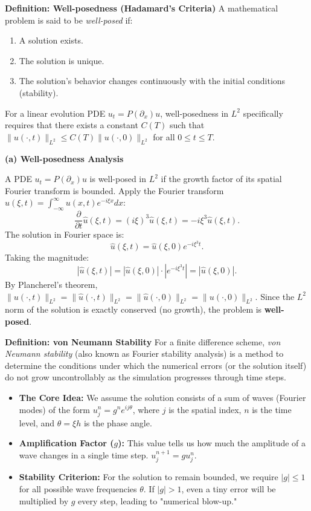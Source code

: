 \begin{solution}
\textbf{Definition: Well-posedness (Hadamard's Criteria)}
A mathematical problem is said to be \textit{well-posed} if:
\begin{enumerate}
    \item A solution exists.
    \item The solution is unique.
    \item The solution's behavior changes continuously with the initial conditions (stability).
\end{enumerate}
For a linear evolution PDE $u_t = P(\partial_x)u$, well-posedness in $L^2$ specifically requires that there exists a constant $C(T)$ such that $\|u(\cdot, t)\|_{L^2} \leq C(T) \|u(\cdot, 0)\|_{L^2}$ for all $0 \leq t \leq T$.

\textbf{(a) Well-posedness Analysis}

A PDE $u_t = P(\partial_x)u$ is well-posed in $L^2$ if the growth factor of its spatial Fourier transform is bounded.
Apply the Fourier transform $\hat{u}(\xi, t) = \int_{-\infty}^\infty u(x, t) e^{-i\xi x} dx$:
\[ \frac{\partial}{\partial t} \hat{u}(\xi, t) = (i\xi)^3 \hat{u}(\xi, t) = -i\xi^3 \hat{u}(\xi, t). \]
The solution in Fourier space is:
\[ \hat{u}(\xi, t) = \hat{u}(\xi, 0) e^{-i\xi^3 t}. \]
Taking the magnitude:
\[ |\hat{u}(\xi, t)| = |\hat{u}(\xi, 0)| \cdot |e^{-i\xi^3 t}| = |\hat{u}(\xi, 0)|. \]
By Plancherel's theorem, $\|u(\cdot, t)\|_{L^2} = \|\hat{u}(\cdot, t)\|_{L^2} = \|\hat{u}(\cdot, 0)\|_{L^2} = \|u(\cdot, 0)\|_{L^2}$.
Since the $L^2$ norm of the solution is exactly conserved (no growth), the problem is \textbf{well-posed}.

\textbf{Definition: von Neumann Stability}
For a finite difference scheme, \textit{von Neumann stability} (also known as Fourier stability analysis) is a method to determine the conditions under which the numerical errors (or the solution itself) do not grow uncontrollably as the simulation progresses through time steps.

\begin{itemize}
    \item \textbf{The Core Idea:} We assume the solution consists of a sum of waves (Fourier modes) of the form $u_j^n = g^n e^{i j \theta}$, where $j$ is the spatial index, $n$ is the time level, and $\theta = \xi h$ is the phase angle.
    \item \textbf{Amplification Factor ($g$):} This value tells us how much the amplitude of a wave changes in a single time step. $u_j^{n+1} = g u_j^n$.
    \item \textbf{Stability Criterion:} For the solution to remain bounded, we require $|g| \leq 1$ for all possible wave frequencies $\theta$. If $|g| > 1$, even a tiny error will be multiplied by $g$ every step, leading to "numerical blow-up."
\end{itemize}


\end{solution}
